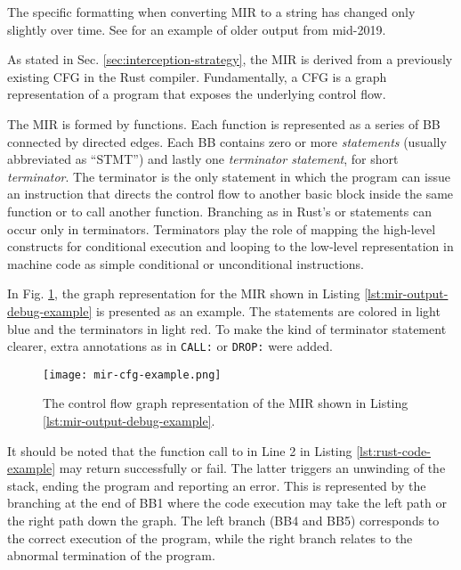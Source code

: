 The specific formatting when converting \acrshort{MIR} to a string has changed only slightly over time.
See \cite[Section 3.3]{meyer2020} for an example of older output from mid-2019.

As stated in Sec. \ref{sec:interception-strategy}, the \acrshort{MIR} is derived
from a previously existing \acrfull{CFG} in the Rust compiler.
Fundamentally, a \acrshort{CFG} is a graph representation of a program
that exposes the underlying control flow.

The MIR is formed by functions.
Each function is represented as a series of \acrfull{BB} connected by directed edges.
Each \acrshort{BB} contains zero or more \emph{statements} (usually abbreviated as ``STMT'')
and lastly one \emph{terminator statement}, for short \emph{terminator}.
The terminator is the only statement in which the program can issue an instruction
that directs the control flow to another basic block inside the same function
or to call another function.
Branching as in Rust's  or  statements can occur only in terminators.
Terminators play the role of mapping the high-level constructs
for conditional execution and looping to the low-level representation in machine code
as simple conditional or unconditional  instructions.

In Fig. \ref{fig:mir-cfg-example}, the graph representation
for the MIR shown in Listing \ref{lst:mir-output-debug-example} is presented as an example.
The statements are colored in light blue and the terminators in light red.
To make the kind of terminator statement clearer,
extra annotations as in \texttt{CALL:} or \texttt{DROP:} were added.

\begin{figure}[!htb]
    \centering
    \texttt{[image: mir-cfg-example.png]}
    \caption{The control flow graph representation of the MIR shown in Listing \ref{lst:mir-output-debug-example}.}
    \label{fig:mir-cfg-example}
\end{figure}

It should be noted that the function call to 
in Line 2 in Listing \ref{lst:rust-code-example} may return successfully or fail.
The latter triggers an unwinding of the stack, ending the program and reporting an error.
This is represented by the branching at the end of BB1 where the code execution
may take the left path or the right path down the graph.
The left branch (BB4 and BB5) corresponds to the correct execution of the program,
while the right branch relates to the abnormal termination of the program.

